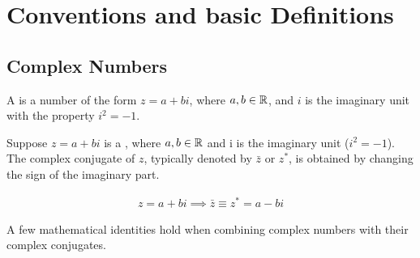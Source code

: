 \section{Conventions and basic Definitions}

\subsection{Complex Numbers}

\begin{defn}
A  is a number of the form $z = a + bi$, where $a,b\in{\mathbb R}$, and $i$ is the imaginary unit with the property $i^2 = -1$.
\end{defn}

\begin{defn}{1}
Suppose $z=a+bi$ is a , where $a,b\in{\mathbb R}$ and i is the imaginary unit ($i^2=-1$). The complex conjugate of $z$, typically denoted by $\bar{z}$ or $z^*$, is obtained by changing the sign of the imaginary part.

\begin{align}
z=a+bi \implies	\bar{z} \equiv z^* = a - bi 
\end{align}
\end{defn}

A few mathematical identities hold when combining complex numbers with their complex conjugates.

